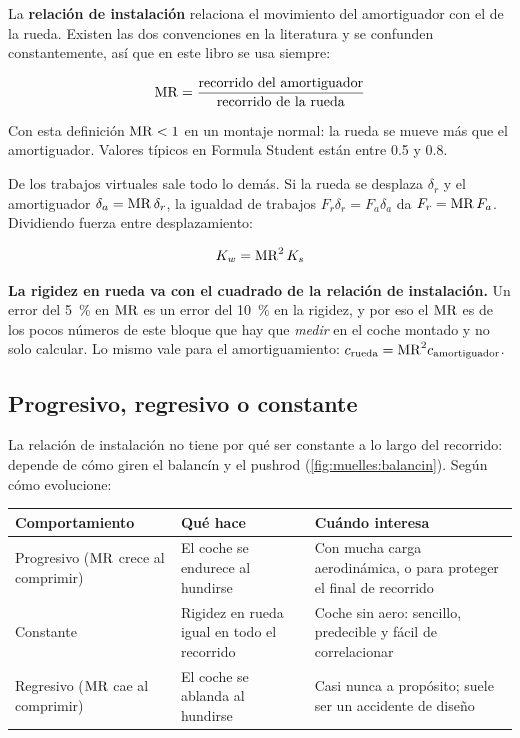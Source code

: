 La \textbf{relación de instalación} relaciona el movimiento del amortiguador con
el de la rueda. Existen las dos convenciones en la literatura y se confunden
constantemente, así que en este libro se usa siempre:

\begin{equation}
  \mathrm{MR} = \frac{\text{recorrido del amortiguador}}{\text{recorrido de la rueda}}
  \label{eq:motion_ratio}
\end{equation}

Con esta definición $\mathrm{MR} < 1$ en un montaje normal: la rueda se mueve más que
el amortiguador. Valores típicos en Formula Student están entre \num{0.5} y
\num{0.8}.

\begin{clave}
De los trabajos virtuales sale todo lo demás. Si la rueda se desplaza
$\delta_r$ y el amortiguador $\delta_a = \mathrm{MR}\,\delta_r$, la igualdad de
trabajos $F_r \delta_r = F_a \delta_a$ da $F_r = \mathrm{MR}\,F_a$. Dividiendo fuerza
entre desplazamiento:

\begin{equation}
  K_w = \mathrm{MR}^{2}\,K_s
  \label{eq:rigidez_rueda}
\end{equation}

\textbf{La rigidez en rueda va con el cuadrado de la relación de instalación.}
Un error del \SI{5}{\percent} en $\mathrm{MR}$ es un error del \SI{10}{\percent} en la
rigidez, y por eso el $\mathrm{MR}$ es de los pocos números de este bloque que hay que
\emph{medir} en el coche montado y no solo calcular. Lo mismo vale para el
amortiguamiento: $c_{\text{rueda}} = \mathrm{MR}^{2} c_{\text{amortiguador}}$.
\end{clave}

\subsection{Progresivo, regresivo o constante}

La relación de instalación no tiene por qué ser constante a lo largo del
recorrido: depende de cómo giren el balancín y el pushrod
(\cref{fig:muelles:balancin}). Según cómo evolucione:

\begin{center}
\begin{tabularx}{\textwidth}{@{}lXX@{}}
\toprule
\textbf{Comportamiento} & \textbf{Qué hace} & \textbf{Cuándo interesa} \\
\midrule
Progresivo ($\mathrm{MR}$ crece al comprimir) & El coche se endurece al hundirse &
  Con mucha carga aerodinámica, o para proteger el final de recorrido \\
Constante & Rigidez en rueda igual en todo el recorrido &
  Coche sin aero: sencillo, predecible y fácil de correlacionar \\
Regresivo ($\mathrm{MR}$ cae al comprimir) & El coche se ablanda al hundirse &
  Casi nunca a propósito; suele ser un accidente de diseño \\
\bottomrule
\end{tabularx}
\end{center}

